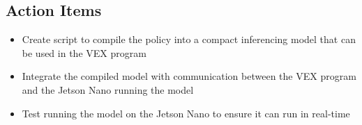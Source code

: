 \subsection{Action Items}
\begin{itemize}
    \item Create script to compile the policy into a compact inferencing model that can be used in the VEX program
    \item Integrate the compiled model with communication between the VEX program and the Jetson Nano running the model
    \item Test running the model on the Jetson Nano to ensure it can run in real-time
\end{itemize}